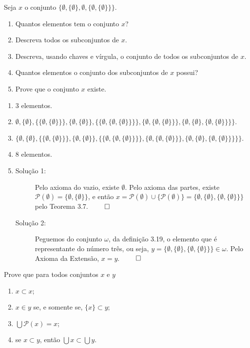 \begin{exercicio}
	Seja $x$ o conjunto $\{\emptyset,\{\emptyset\},\emptyset,\{\emptyset,\{\emptyset\}\}\}$.
	\begin{enumerate}[label=(\alph{*})]
		\item Quantos elementos tem o conjunto $x$?
		\item Descreva todos os subconjuntos de $x$.
		\item Descreva, usando chaves e vírgula, o conjunto de todos os subconjuntos de $x$.
		\item Quantos elementos o conjunto dos subconjuntos de $x$ possui?
		\item Prove que o conjunto $x$ existe.
	\end{enumerate}
\end{exercicio}

\begin{enumerate}[label=(\alph{*})]
	\item 3 elementos.
	\item $\emptyset,\{\emptyset\},\{\{\emptyset,\{\emptyset\}\}\},\{\emptyset,\{\emptyset\}\},\{\{\emptyset,\{\emptyset,\{\emptyset\}\}\}\},\{\emptyset,\{\emptyset,\{\emptyset\}\}\},\{\emptyset,\{\emptyset\},\{\emptyset,\{\emptyset\}\}\}\}$.
	\item $\{\emptyset,\{\emptyset\},\{\{\emptyset,\{\emptyset\}\}\},\{\emptyset,\{\emptyset\}\},\{\{\emptyset,\{\emptyset,\{\emptyset\}\}\}\},\{\emptyset,\{\emptyset,\{\emptyset\}\}\},\{\emptyset,\{\emptyset\},\{\emptyset,\{\emptyset\}\}\}\}\}$.
	\item 8 elementos.
	\item 
	\begin{description}
		\item[Solução 1:] Pelo axioma do vazio, existe $\emptyset$. Pelo axioma das partes, existe $\mathcal{P}(\emptyset)=\{\emptyset,\{\emptyset\}\}$, e então $x=\mathcal{P}(\emptyset)\cup\{\mathcal{P}(\emptyset)\}=\{\emptyset,\{\emptyset\},\{\emptyset,\{\emptyset\}\}\}$ pelo Teorema 3.7. $\qed$
		\item[Solução 2:] Peguemos do conjunto $\omega$, da definição 3.19, o elemento que é representante do número três, ou seja, $y = \{\emptyset, \{\emptyset\}, \{\emptyset, \{\emptyset\}\}\} \in \omega$. Pelo Axioma da Extensão, $x = y$. $\qed$ 
	\end{description}
\end{enumerate}

\begin{exercicio}
	Prove que para todos conjuntos $x$ e $y$
	\begin{enumerate}[label=(\alph{*})]
		\item $x\subset x$;
		\item $x\in y$ se, e somente se, $\{x\}\subset y$;
		\item $\bigcup\mathcal{P}(x)=x$;
		\item se $x\subset y$, então $\bigcup x\subset \bigcup y$.
	\end{enumerate}
\end{exercicio}

